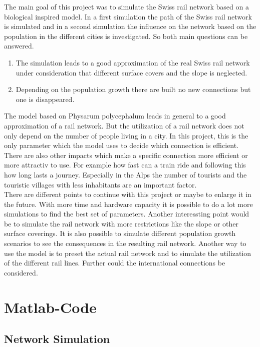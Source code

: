 \documentclass[11pt]{scrartcl}
\begin{document}
The main goal of this project was to simulate the Swiss rail network based on a biological inspired model. In a first simulation the path of the Swiss rail network is simulated and in a second simulation the influence on the network based on the population in the different cities is investigated. So both main questions can be answered.

\begin{enumerate}
\item The simulation leads to a good approximation of the real Swiss rail network under consideration that different surface covers and the slope is neglected.
\item Depending on the population growth there are built no new connections but one is disappeared.
\end{enumerate}

The model based on Physarum polycephalum leads in general to a good approximation of a rail network. But the utilization of a rail network does not only depend on the number of people living in a city. In this project, this is the only parameter which the model uses to decide which connection is efficient. There are also other impacts which make a specific connection more efficient or more attractiv to use. For example how fast can a train ride and following this how long lasts a journey. Especially in the Alps the number of tourists and the touristic villages with less inhabitants are an important factor.\\

There are different points to continue with this project or maybe to enlarge it in the future. With more time and hardware capacity it is possible to do a lot more simulations to find the best set of parameters. Another interessting point would be to simulate the rail network with more restrictions like the slope or other surface coverings. It is also possible to simulate different population growth scenarios to see the consequences in the resulting rail network. Another way to use the model is to preset the actual rail network and to simulate the utilization of the different rail lines.
Further could the international connections be considered.


\newpage
\appendix
\section{Matlab-Code}

\subsection{Network Simulation}
\label{sec:network_simulation}
\end{document}
